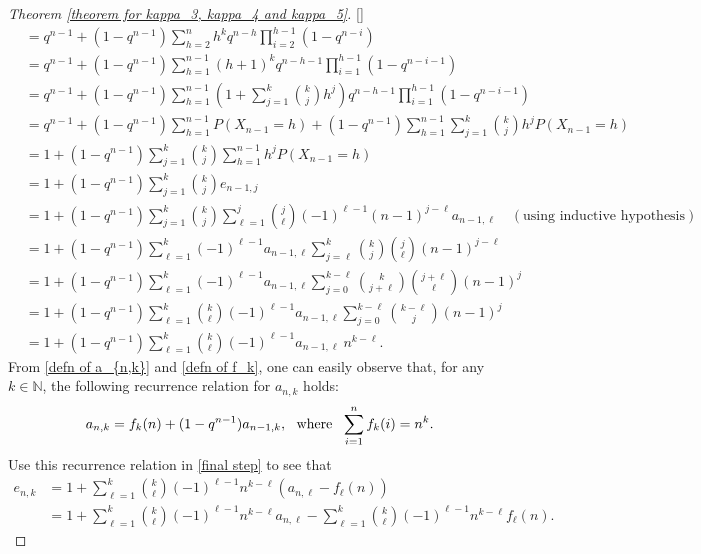 \documentclass[11pt,reqno]{amsart}
\renewcommand{\(}{\left\(}
\renewcommand{\)}{\right\)}
\renewcommand{\[}{\left\[}
\renewcommand{\]}{\right\]}
\numberwithin{equation}{section}
\theoremstyle{plain}
\begin{document}
\begin{proof}[Theorem \ref{theorem for kappa_3, kappa_4 and kappa_5}][]
{\begin{align}
&= q^{n-1} + (1- q^{n-1}) \sum_{h=2}^n h^k q^{n-h} \prod_{i=2}^{h-1} (1- q^{n-i}) \nonumber \\
& =  q^{n-1} + (1- q^{n-1})   \sum_{h=1}^{n-1} (h+1)^k q^{n-h-1} \prod_{i=1}^{h-1} (1- q^{n-i-1}) \nonumber \\
& = q^{n-1} + (1- q^{n-1})   \sum_{h=1}^{n-1} \left( 1+ \sum_{j=1}^k  {k \choose j} h^j \right) q^{n-h-1} \prod_{i=1}^{h-1} (1- q^{n-i-1}) \nonumber \\
& = q^{n-1} + (1- q^{n-1}) \sum_{h=1}^{n-1} P(X_{n-1}=h) + (1- q^{n-1}) \sum_{h=1}^{n-1} \sum_{j=1}^k {k \choose j} h^j  P(X_{n-1}=h) \nonumber \\
& = 1 + (1- q^{n-1}) \sum_{j=1}^k {k \choose j} \sum_{h=1}^{n-1} h^j  P(X_{n-1}=h) \nonumber \\
& = 1 + (1- q^{n-1}) \sum_{j=1}^k {k \choose j} e_{n-1,  j}  \nonumber \\
& = 1 + (1- q^{n-1}) \sum_{j=1}^k {k \choose j}  \sum_{\ell= 1}^j {j \choose \ell} (-1)^{\ell -1} (n-1)^{j- \ell} a_{n-1,  \ell} \quad (\textrm{using inductive hypothesis}) \nonumber \\
& = 1 + (1- q^{n-1}) \sum_{\ell= 1}^k (-1)^{\ell -1} a_{n-1,  \ell} \sum_{j= \ell}^k {k \choose j} {j \choose \ell}  (n-1)^{j- \ell} \nonumber \\
&= 1 + (1- q^{n-1}) \sum_{\ell= 1}^k (-1)^{\ell -1} a_{n-1,  \ell} \sum_{j=0}^{k-\ell} {k \choose j+\ell} {j+\ell \choose \ell} (n-1)^j  \nonumber \\
& = 1 + (1- q^{n-1}) \sum_{\ell= 1}^k {k \choose \ell} (-1)^{\ell -1} a_{n-1,  \ell} \sum_{j=0}^{k-\ell} {k-\ell \choose j} (n-1)^j  \nonumber \\
& =  1 + (1- q^{n-1}) \sum_{\ell= 1}^k {k \choose \ell} (-1)^{\ell -1} a_{n-1,  \ell}~ n^{k - \ell}.  \label{final step}
\end{align}}
From \eqref{defn of a_{n,k}} and \eqref{defn of f_k},  one can easily observe that,  for any $k \in \mathbb{N}$,  the following recurrence relation for $a_{n,k}$ holds: 
\begin{align}\label{relation of a_{n,k}}
a_{n,k} = f_k(n) + (1- q^{n-1}) a_{n-1,  k},~~\textrm{where}~~\sum_{i=1}^n f_k(i) = n^k.   
\end{align}
 Use this recurrence relation in \eqref{final step} to see that 
\begin{align*}
e_{n, k} & = 1 +  \sum_{\ell= 1}^k {k \choose \ell} (-1)^{\ell -1} n^{k - \ell} \left( a_{n, \ell} - f_{\ell}(n)  \right) \\
& = 1 +  \sum_{\ell= 1}^k {k \choose \ell} (-1)^{\ell -1} n^{k - \ell}  a_{n, \ell} - \sum_{\ell= 1}^k {k \choose \ell} (-1)^{\ell -1} n^{k - \ell}  f_{\ell}(n). 

\end{align*}
\end{proof}
\end{document}
